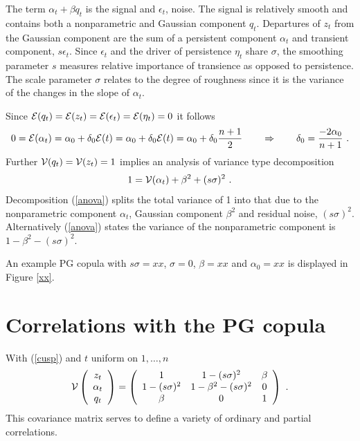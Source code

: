 \documentclass[authoryear]{elsarticle}
\newcommand{\cov}{\mathrm{cov}}
\newcommand{\eps}{\epsilon}
\newcommand{\Ex}{{\cal E}}
\newcommand{\eref}[1]{(\ref{#1})}
\newcommand{\fref}[1]{Figure \ref{#1}}
\newcommand{\cq}{\ , \qquad}
\newcommand{\Vx}{{\cal V}}
\newcommand{\be}[1]{\begin{equation}\label{#1}}
\newcommand{\ee}{\end{equation}}
\begin{document}
 
 
 
 
 The term $\alpha_t+\beta q_t$ is the signal and $\eps_t$, noise.    The signal is relatively smooth and contains both a nonparametric and Gaussian component $q_t$.   Departures of $z_t$ from the Gaussian component  are the sum of a persistent component $\alpha_t$ and  transient component, $s\eps_t$.  Since  $\eps_t$ and  the driver of persistence $\eta_t$  share $\sigma$, the smoothing parameter $s$ measures relative importance of transience as opposed to persistence.   The scale parameter $\sigma$ relates to the degree of roughness since it is the variance of the changes in the  slope of $\alpha_t$.
 

 
  Since $\Ex(q_t)=\Ex(z_t)=\Ex(\eps_t)=\Ex(\eta_t)=0$ it follows  
 $$
0= \Ex(\alpha_t)=\alpha_0+\delta_0 \Ex(t) = \alpha_0+\delta_0 \Ex(t) = \alpha_0+\delta_0 \frac{n+1}{2}\qquad\Rightarrow\qquad \delta_0 = \frac{-2\alpha_0}{n+1}\ .
 $$ 
Further $\Vx(q_t)=\Vx(z_t)=1$ implies an analysis of variance type decomposition
\be{anova}
 1= \Vx(\alpha_t) + \beta^2 + (s\sigma)^2\ .
\ee
Decomposition \eref{anova} splits the total variance  of 1 into that due to the nonparametric component $\alpha_t$,  Gaussian component $\beta^2$ and residual noise, $(s\sigma)^2$.  Alternatively \eref{anova} states the variance of the nonparametric component is $1-\beta^2-(s\sigma)^2$.

An example PG copula with $s\sigma=xx$, $\sigma=0$, $\beta=xx$ and $\alpha_0=xx$  is displayed in \fref{xx}.  

 
 



\section{Correlations with the PG copula}
With \eref{cusp}  and $t$ uniform on $1,\ldots,n$ 
$$
\Vx\left(\begin{array}{c} z_t\\ \alpha_t\\ q_t\\ \end{array}\right)
=\left(\begin{array}{ccc} 
1 & 1-(s\sigma)^2 & \beta\\
1-(s\sigma)^2 & 1-\beta^2-(s\sigma)^2 & 0\\
\beta & 0 & 1\\
\end{array}\right)\ .
$$
This covariance matrix serves to define a variety of ordinary and partial correlations.
\end{document}
